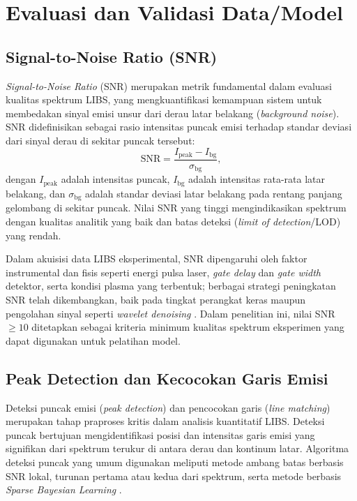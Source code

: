 
\section{Evaluasi dan Validasi Data/Model}

\subsection{Signal-to-Noise Ratio (SNR)}

\textit{Signal-to-Noise Ratio} (SNR) merupakan metrik fundamental dalam evaluasi kualitas spektrum LIBS, yang mengkuantifikasi kemampuan sistem untuk membedakan sinyal emisi unsur dari derau latar belakang (\textit{background noise}). SNR didefinisikan sebagai rasio intensitas puncak emisi terhadap standar deviasi dari sinyal derau di sekitar puncak tersebut:
%
\begin{equation} \label{eq:bab2_snr}
    \text{SNR} = \frac{I_{\text{peak}} - I_{\text{bg}}}{\sigma_{\text{bg}}},
\end{equation}
%
dengan $I_{\text{peak}}$ adalah intensitas puncak, $I_{\text{bg}}$ adalah intensitas rata-rata latar belakang, dan $\sigma_{\text{bg}}$ adalah standar deviasi latar belakang pada rentang panjang gelombang di sekitar puncak. Nilai SNR yang tinggi mengindikasikan spektrum dengan kualitas analitik yang baik dan batas deteksi (\textit{limit of detection}/LOD) yang rendah.

Dalam akuisisi data LIBS eksperimental, SNR dipengaruhi oleh faktor instrumental dan fisis seperti energi pulsa laser, \textit{gate delay} dan \textit{gate width} detektor, serta kondisi plasma yang terbentuk; berbagai strategi peningkatan SNR telah dikembangkan, baik pada tingkat perangkat keras \citep{khan_magnetic_2022} maupun pengolahan sinyal seperti \textit{wavelet denoising} \citep{guerrini_optimization_2025}. Dalam penelitian ini, nilai SNR $\geq 10$ ditetapkan sebagai kriteria minimum kualitas spektrum eksperimen yang dapat digunakan untuk pelatihan model.

\subsection{Peak Detection dan Kecocokan Garis Emisi}

Deteksi puncak emisi (\textit{peak detection}) dan pencocokan garis (\textit{line matching}) merupakan tahap praproses kritis dalam analisis kuantitatif LIBS. Deteksi puncak bertujuan mengidentifikasi posisi dan intensitas garis emisi yang signifikan dari spektrum terukur di antara derau dan kontinum latar. Algoritma deteksi puncak yang umum digunakan meliputi metode ambang batas berbasis SNR lokal, turunan pertama atau kedua dari spektrum, serta metode berbasis \textit{Sparse Bayesian Learning} \citep{zhu_residual_2025}.


